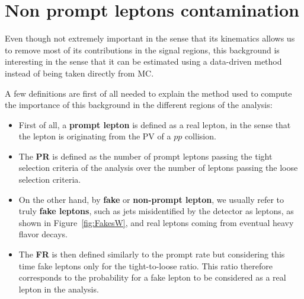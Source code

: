 \documentclass[a4paper, 10pt, openright]{report}
\begin{document}
\section{Non prompt leptons contamination} \label{subsection:Fakes}

Even though not extremely important in the sense that its kinematics allows us to remove most of its contributions in the signal regions, this background is interesting in the sense that it can be estimated using a data-driven method instead of being taken directly from \ac{MC}.

A few definitions are first of all needed to explain the method used to compute the importance of this background in the different regions of the analysis:
\begin{itemize}
\item First of all, a \textbf{prompt lepton} is defined as a real lepton, in the sense that the lepton is originating from the \ac{PV} of a $pp$ collision.
\item The \textbf{\ac{PR}} is defined as the number of prompt leptons passing the tight selection criteria of the analysis over the number of leptons passing the loose selection criteria. 
\item On the other hand, by \textbf{fake} or \textbf{non-prompt lepton}, we usually refer to truly \textbf{fake leptons}, such as jets misidentified by the detector as leptons, as shown in Figure~\ref{fig:FakesW}, and real leptons coming from eventual heavy flavor decays.
\item The \textbf{\ac{FR}} is then defined similarly to the prompt rate but considering this time fake leptons only for the tight-to-loose ratio. This ratio therefore corresponds to the probability for a fake lepton to be considered as a real lepton in the analysis.
\end{itemize}
\end{document}
